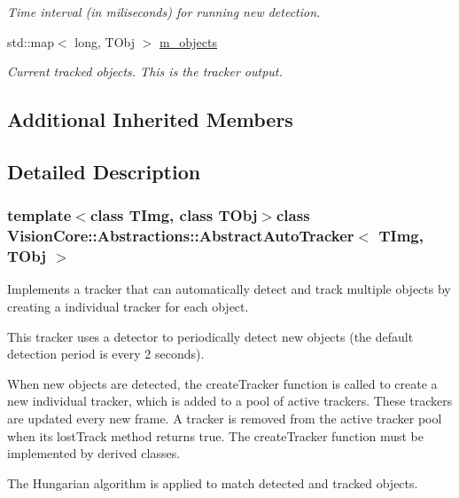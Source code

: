 \begin{DoxyCompactItemize}
\begin{DoxyCompactList}\small\item\em Time interval (in miliseconds) for running new detection. \end{DoxyCompactList}\item 
\hypertarget{class_vision_core_1_1_abstractions_1_1_abstract_auto_tracker_a8afc7c56f236400edc420b0f6b830ea1}{}std\+::map$<$ long, T\+Obj $>$ \hyperlink{class_vision_core_1_1_abstractions_1_1_abstract_auto_tracker_a8afc7c56f236400edc420b0f6b830ea1}{m\+\_\+objects}\label{class_vision_core_1_1_abstractions_1_1_abstract_auto_tracker_a8afc7c56f236400edc420b0f6b830ea1}

\begin{DoxyCompactList}\small\item\em Current tracked objects. This is the tracker output. \end{DoxyCompactList}\end{DoxyCompactItemize}
\subsection*{Additional Inherited Members}


\subsection{Detailed Description}
\subsubsection*{template$<$class T\+Img, class T\+Obj$>$class Vision\+Core\+::\+Abstractions\+::\+Abstract\+Auto\+Tracker$<$ T\+Img, T\+Obj $>$}

Implements a tracker that can automatically detect and track multiple objects by creating a individual tracker for each object. 

This tracker uses a detector to periodically detect new objects (the default detection period is every 2 seconds).

When new objects are detected, the create\+Tracker function is called to create a new individual tracker, which is added to a pool of active trackers. These trackers are updated every new frame. A tracker is removed from the active tracker pool when its lost\+Track method returns true. The create\+Tracker function must be implemented by derived classes.

The Hungarian algorithm is applied to match detected and tracked objects.


